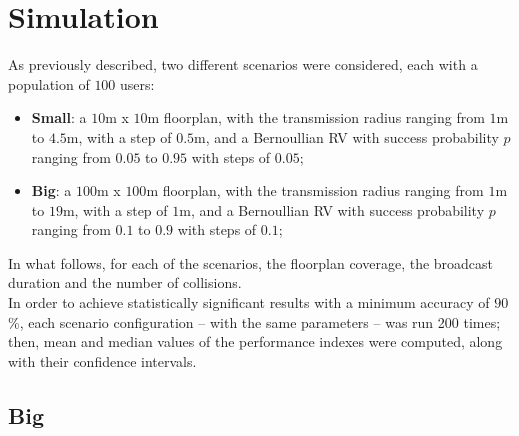 %
\chapter{Simulation}\label{simulation}
As previously described, two different scenarios were considered, each with a population of $100$ users:
\begin{itemize}
    \item \textbf{Small}: a $10$m x $10$m floorplan, with the transmission
    radius ranging from $1$m to $4.5$m, with a step of $0.5$m, and a Bernoullian
    RV with success probability $p$ ranging from $0.05$ to $0.95$ with steps of
    $0.05$;
    \item \textbf{Big}: a $100$m x $100$m floorplan, with the transmission
    radius ranging from $1$m to $19$m, with a step of $1$m, and a Bernoullian RV
    with success probability $p$ ranging from $0.1$ to $0.9$ with steps of $0.1$;
\end{itemize}
In what follows, for each of the scenarios, the floorplan coverage, the
broadcast duration and the number of collisions.\\
In order to achieve statistically significant results with a minimum accuracy of
$90$\%, each scenario configuration -- with the same parameters -- was run 200 times; then, mean and median values of the performance
indexes were computed, along with their confidence intervals.
\section{Big}\label{big}
